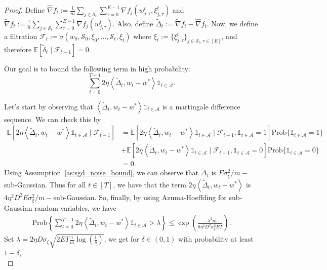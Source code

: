 \documentclass{article} %
\DeclareMathOperator{\E}{\E}
\def\E{{\mathbb E}}
\def\A{{\mathcal A}}
\def\S{{\mathcal S}}
\newcommand{\inner}[2]{\left\langle #1, #2 \right\rangle}
\begin{document}
\begin{proof}
    Define $\hat\nabla f_t:= \frac{1}{m}\sum_{j\in \S_t}\sum_{\tau=0}^{E-1}\nabla f_j(w_{j,\tau}^t, \xi_{j,\tau}^t)$ and $\tilde{\nabla}f_t := \frac{1}{n}\sum_{j\in \S_t}\sum_{\tau=0}^{E-1}\nabla f_j(w_{j,\tau}^t)$. Also, define $\tilde \Delta_t:= \tilde{\nabla}f_t - \hat \nabla f_t$. Now, we define a filtration $\mathcal{F}_{t} := \sigma(w_0, \S_0, \xi_0, \ldots, \S_t, \xi_t)$ where $\xi_t := \{\xi_{j,\tau}^t\}_{j \in \S_t, \tau \in [E]}$, and therefore $\E[\tilde \delta_t\mid\mathcal{F}_{t-1}]=0$.
    
    Our goal is to bound the following term in high probability: $$\sum_{t=0}^{T-1}2\eta\inner{\tilde \Delta_t}{w_t-w^*}\mathds{1}_{t\in \A}.$$

    Let's start by observing that $\inner{\tilde \Delta_t}{w_t-w^*}\mathds{1}_{t\in \A}$ is a martingale difference sequence. We can check this by
    \begin{align*}
        \E[2\eta\inner{\tilde \Delta_t}{w_t-w^*}\mathds{1}_{t\in \A}\mid\mathcal{F}_{t-1}] &= \E[2\eta\inner{\tilde \Delta_t}{w_t-w^*}\mathds{1}_{t\in \A}\mid\mathcal{F}_{t-1}, \mathds{1}_{t\in \A}=1] \text{Prob}\{\mathds{1}_{t\in \A}=1\}
        \\
        &+ \E[2\eta\inner{\tilde \Delta_t}{w_t-w^*}\mathds{1}_{t\in \A}\mid\mathcal{F}_{t-1},\mathds{1}_{t\in \A}=0]\text{Prob}\{\mathds{1}_{t\in \A}=0\}
        \\
        &=0.
    \end{align*}
    Using Assumption~\ref{as:sgd_noise_bound}, we can observe that $\tilde{\Delta}_t$ is $E\sigma_\xi^2/m-$sub-Gaussian. Thus for all $t \in [T]$, we have that the term $2\eta\inner{\tilde \Delta_t}{w_t-w^*}$ is $4\eta^2D^2E\sigma_\xi^2/m-$sub-Gaussian.
    So, finally, by using Azuma-Hoeffding for sub-Gaussian random variables, we have
    \begin{equation*}
        \begin{aligned}
            \text{Prob}\left\{\sum_{t=0}^{T-1}2\eta\inner{\tilde \Delta_t}{w_t-w^*}\mathds{1}_{t\in \A} > \lambda \right\} \leq \exp \left(\frac{-\lambda^2m}{8\eta^2D^2 \sigma_\xi^2 ET}\right).
        \end{aligned}
    \end{equation*}
    Set $\lambda = 2\eta D \sigma_\xi\sqrt{2E T \frac{1}{m}\log(\frac{1}{\delta})}$, we get for $\delta \in (0,1)$ with probability at least $1-\delta$,
    \begin{equation}
        \label{eq:prob_inner_final_obj_data}

\end{equation}
\end{proof}
\end{document}
